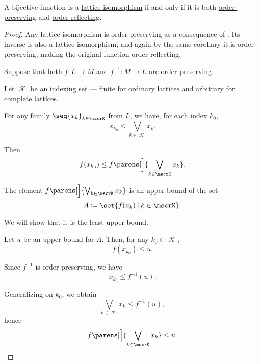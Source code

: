 \begin{proposition}\label{thm:lattice_isomorphism_characterization}
  A bijective function is a \hyperref[def:semilattice/homomorphism]{lattice isomorphism} if and only if it is both \hyperref[def:order_homomorphism/increasing]{order-preserving} and \hyperref[def:order_homomorphism/reflecting]{order-reflecting}.
\end{proposition}
\begin{proof}
  \SufficiencySubProof Any lattice isomorphism is order-preserving as a consequence of . Its inverse is also a lattice isomorphism, and again by the same corollary it is order-preserving, making the original function order-reflecting.

  \NecessitySubProof Suppose that both \( f: L \to M \) and \( f^{-1}: M \to L \) are order-preserving.

   Let \( \mscrK \) be an indexing set --- finite for ordinary lattices and arbitrary for complete lattices.

  For any family \( \seq{ x_k }_{k \in \mscrK} \) from \( L \), we have, for each index \( k_0 \),
  \begin{equation*}
    x_{k_0} \leq \bigvee_{k \in \mscrK} x_k.
  \end{equation*}

  Then
  \begin{equation*}
    f(x_{k_0}) \leq f\parens[\Big]{ \bigvee_{k \in \mscrK} x_k }.
  \end{equation*}

  The element \( f\parens[\Big]{ \bigvee_{k \in \mscrK} x_k } \) is an upper bound of the set
  \begin{equation*}
    A \coloneqq \set{ f(x_k) \given k \in \mscrK }.
  \end{equation*}

  We will show that it is the least upper bound.

  Let \( u \) be an upper bound for \( A \). Then, for any \( k_0 \in \mscrK \),
  \begin{equation*}
    f(x_{k_0}) \leq u.
  \end{equation*}

  Since \( f^{-1} \) is order-preserving, we have
  \begin{equation*}
    x_{k_0} \leq f^{-1}(u).
  \end{equation*}

  Generalizing on \( k_0 \), we obtain
  \begin{equation*}
    \bigvee_{k \in \mscrK} x_k \leq f^{-1}(u),
  \end{equation*}
  hence
  \begin{equation*}
    f\parens[\Big]{ \bigvee_{k \in \mscrK} x_k } \leq u.
  \end{equation*}


\end{proof}
